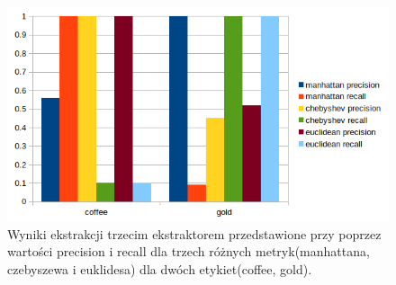 \documentclass{classrep}
\begin{document}
\begin{figure}[H]
  \includegraphics[width=\linewidth]{wykresy/3ext2tag3mp_precrec.png}
  \caption{Wyniki ekstrakcji trzecim ekstraktorem przedstawione przy poprzez wartości precision i recall dla trzech różnych metryk(manhattana, czebyszewa i euklidesa) dla dwóch etykiet(coffee, gold).}
  \label{fig:TOPICS3}
\end{figure}
\end{document}
